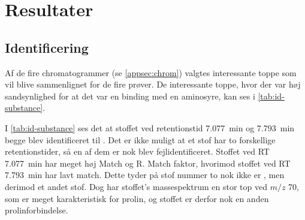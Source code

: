 \section{Resultater}
\subsection{Identificering}
Af de fire chromatogrammer (se \cref{appsec:chrom}) valgtes interessante toppe som vil blive sammenlignet for de fire prøver.
De interessante toppe, hvor der var høj sandsynlighed for at det var en binding med en aminosyre, kan ses i \cref{tab:id-substance}.

\par I \cref{tab:id-substance} ses det at stoffet ved retentionstid \qty{7.077}{\minute} og \qty{7.793}{\minute} begge blev identificeret til .
Det er ikke muligt at et stof har to forskellige retentionstider, så en af dem er nok blev fejlidentificeret.
Stoffet ved RT \qty{7.077}{\minute} har meget høj Match og R. Match faktor, hvorimod stoffet ved RT \qty{7.793}{\minute} har lavt match.
Dette tyder på stof nummer to nok ikke er , men derimod et andet stof.
Dog har stoffet's massespektrum en stor top ved $m/z$ \num{70}, som er meget karakteristisk for prolin, og stoffet er derfor nok en anden prolinforbindelse.
